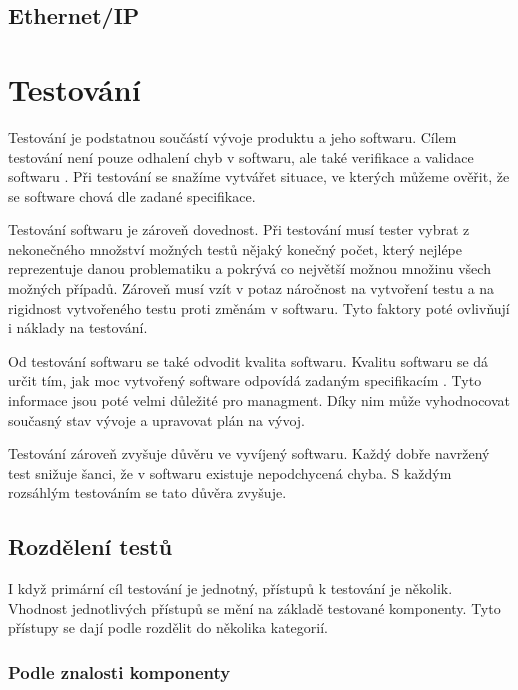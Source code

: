 \subsection{Ethernet/IP}

\section{Testování}

Testování je podstatnou součástí vývoje produktu a jeho softwaru. Cílem testování není pouze odhalení chyb v softwaru, ale také verifikace a validace softwaru \cite{singh2012software}. Při testování se snažíme vytvářet situace, ve kterých můžeme ověřit, že se software chová dle zadané specifikace.

Testování softwaru je zároveň dovednost. Při testování musí tester vybrat z nekonečného množství možných testů nějaký konečný počet, který nejlépe reprezentuje danou problematiku a pokrývá co největší možnou množinu všech možných případů. Zároveň musí vzít v potaz náročnost na vytvoření testu a na rigidnost vytvořeného testu proti změnám v softwaru. Tyto faktory poté ovlivňují i náklady na testování. \cite{fewster1999software}

Od testování softwaru se také odvodit kvalita softwaru. Kvalitu softwaru se dá určit tím, jak moc vytvořený software odpovídá zadaným specifikacím \cite{software_quality}. Tyto informace jsou poté velmi důležité pro managment. Díky nim může vyhodnocovat současný stav vývoje a upravovat plán na vývoj. 

Testování zároveň zvyšuje důvěru ve vyvíjený softwaru. Každý dobře navržený test snižuje šanci, že v softwaru existuje nepodchycená chyba. S každým rozsáhlým testováním se tato důvěra zvyšuje. \cite{fewster1999software}



\subsection{Rozdělení testů}

I když primární cíl testování je jednotný, přístupů k testování je několik. Vhodnost jednotlivých přístupů se mění na základě testované komponenty. Tyto přístupy se dají podle \cite{luo2001software} rozdělit do několika kategorií.

\subsubsection{Podle znalosti komponenty}

